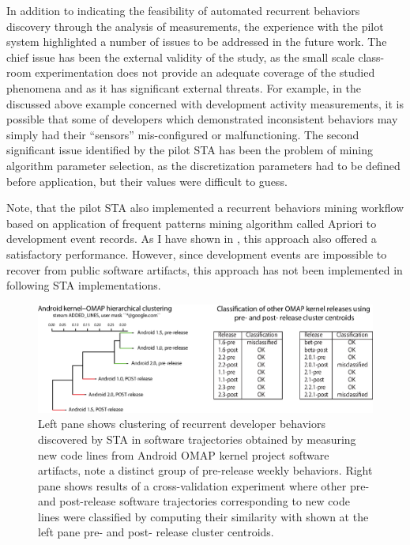 In addition to indicating the feasibility of automated recurrent behaviors discovery through the analysis of measurements, 
the experience with the pilot system highlighted a number of issues to be addressed in the future work.
The chief issue has been the external validity of the study, as the small scale class-room experimentation does not provide 
an adequate coverage of the studied phenomena and as it has significant external threats. 
For example, in the discussed above example concerned with development activity measurements, it is possible that some 
of developers which demonstrated inconsistent behaviors may simply had their ``sensors'' mis-configured or malfunctioning.
The second significant issue identified by the pilot STA has been the problem of mining algorithm parameter selection, as
the discretization parameters had to be defined before application, but their values were difficult to guess.

Note, that the pilot STA also implemented a recurrent behaviors mining workflow based on application of frequent patterns 
mining algorithm called Apriori \cite{citeulike:775528} to development event records. 
As I have shown in \cite{citeulike:13159603}, this approach also offered a satisfactory performance. 
However, since development events are impossible to recover from public software artifacts, this approach has not been 
implemented in following STA implementations.

\begin{figure}[t]
   \centering
   \includegraphics[width=145mm]{figures/STA2-draft.eps}
   \caption{
   Left pane shows clustering of recurrent developer behaviors discovered by STA in software trajectories obtained by 
   measuring new code lines from Android OMAP kernel project software artifacts, note a distinct group of pre-release weekly 
   behaviors.  
   Right pane shows results of a cross-validation experiment where other pre- and post-release software trajectories 
   corresponding to new code lines were classified by computing their similarity with shown at the left pane pre- and 
   post- release  cluster centroids.}
   \label{fig:STA2-results}
\end{figure}

